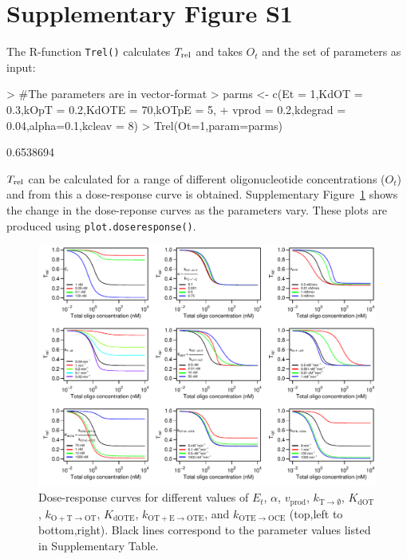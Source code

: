 \documentclass[a4paper,11pt]{article}
\newcommand{\kOpT}{k_{\mathrm{O+T \to OT}}}
\newcommand{\kt}{k_{\mathrm{OT+E \to OTE}}}
\newcommand{\kE}{k_{\mathrm{OTE \to OCE}}}
\newcommand{\vp}{v_{\mathrm{prod}}}
\newcommand{\vd}{k_{\mathrm{T \to \emptyset}}}
\newcommand{\Trel}{T_{\rm{rel}}}
\newcommand{\KdOT}{K_{\mathrm{dOT}}}
\newcommand{\KdOTE}{K_{\mathrm{dOTE}}}
\begin{document}
\section{Supplementary Figure S1}
The R-function \texttt{Trel()} calculates $\Trel$ and takes $O_t$ and the set of parameters as input:
\begin{Schunk}
\begin{Sinput}
> #The parameters are in vector-format
> parms <- c(Et = 1,KdOT = 0.3,kOpT = 0.2,KdOTE = 70,kOTpE = 5,	
+            vprod = 0.2,kdegrad = 0.04,alpha=0.1,kcleav = 8)
> Trel(Ot=1,param=parms)
\end{Sinput}
\begin{Soutput}
[1] 0.6538694
\end{Soutput}
\end{Schunk}
$\Trel$ can be calculated for a range of different oligonucleotide concentrations ($O_t$) and from this a dose-response curve is obtained. Supplementary Figure~\ref{fig::Etot} shows the change in the dose-reponse curves as the parameters vary. These plots are produced using \texttt{plot.doseresponse()}.
\begin{figure}[!b]
\includegraphics[width=\textwidth]{SuppFile1-S1.pdf}
\caption{Dose-response curves for different values of $E_{t}$, $\alpha$, $\vp$, $\vd$, $\KdOT$, $\kOpT$, $\KdOTE$, $\kt$, and $\kE$ (top,left to bottom,right). Black lines correspond to the parameter values listed in Supplementary Table.}\label{fig::Etot}
\end{figure}


\end{document}
